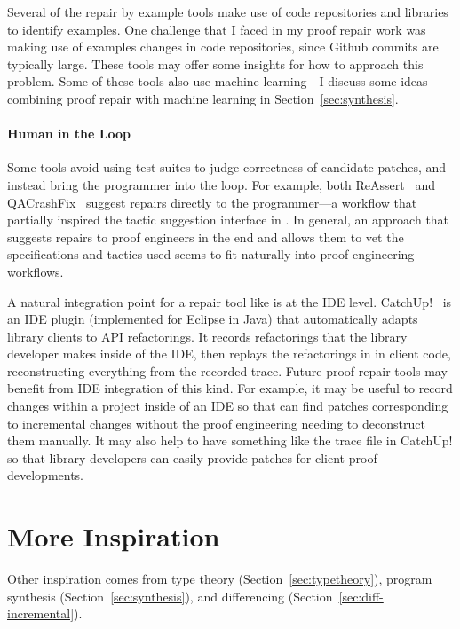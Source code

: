 Several of the repair by example tools make use of code repositories and libraries to identify examples.
One challenge that I faced in my proof repair work was making use of examples changes in code repositories, since Github commits are typically large.
These tools may offer some insights for how to approach this problem.
Some of these tools also use machine learning---I discuss some ideas combining proof repair
with machine learning in Section~\ref{sec:synthesis}.

\paragraph{Human in the Loop}
Some tools avoid using test suites to judge correctness of candidate patches, and instead
bring the programmer into the loop. For example, both ReAssert~\cite{daniel2009reassert}
and QACrashFix~\cite{gao2015fixing} suggest repairs directly to the programmer---a workflow
that partially inspired the tactic suggestion interface in \toolnamec.
In general, an approach that suggests repairs to proof engineers in the end
and allows them to vet the specifications and tactics used seems to fit naturally into proof engineering workflows. 

A natural integration point for a repair tool like \sysnamelong is at the IDE level. 
CatchUp!~\cite{Henkel:2005:CCR:1062455.1062512} is an IDE plugin (implemented for Eclipse in Java) that automatically adapts library clients to API refactorings.
It records refactorings that the library developer makes inside of the IDE,
then replays the refactorings in in client code, reconstructing everything from the recorded trace.
Future proof repair tools may benefit from IDE integration of this kind.
For example, it may be useful to record changes within a project inside of an IDE 
so that \sysnamelong can find patches corresponding to incremental changes without the proof engineering needing to deconstruct them manually.
It may also help to have something like the trace file in CatchUp! so that library developers can easily provide patches for client proof developments.

\iffalse
\section{More Inspiration}
\label{sec:inspiration}

Other inspiration comes from type theory (Section~\ref{sec:typetheory}),
program synthesis (Section~\ref{sec:synthesis}),
and differencing (Section~\ref{sec:diff-incremental}).


